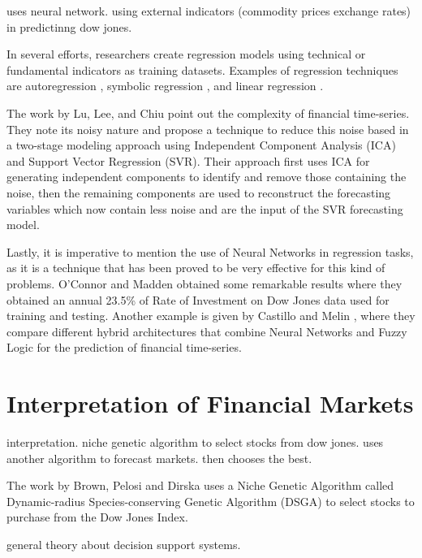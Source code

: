 \cite{Connor2005} uses neural network. using external indicators (commodity
prices exchange rates) in predictinng dow jones.

In several efforts, researchers create regression models using technical or
fundamental indicators as training datasets. Examples of regression techniques
are autoregression \cite{burg1968new}, symbolic regression
\cite{billard2002symbolic}, and linear regression \cite{kutner2004applied}.


The work by Lu, Lee, and Chiu \cite{Lu2009} point out the complexity of
financial time-series. They note its noisy nature and propose a technique to
reduce this noise based in a two-stage modeling approach using Independent
Component Analysis (ICA) and Support Vector Regression (SVR). Their approach
first uses ICA for generating independent components to identify and remove
those containing the noise, then the remaining components are used to
reconstruct the forecasting variables which now contain less noise and are the
input of the SVR forecasting model.


Lastly, it is imperative to mention the use of Neural Networks in regression
tasks, as it is a technique that has been proved to be very effective for this
kind of problems. O'Connor and Madden \cite{Connor2005} obtained some remarkable
results where they obtained an annual 23.5\% of Rate of Investment on Dow Jones
data used for training and testing. Another example is given by Castillo and
Melin \cite{castillo2001simulation}, where they compare different hybrid
architectures that combine Neural Networks and Fuzzy Logic for the prediction of
financial time-series.

\section{Interpretation of Financial Markets}
\label{section:interpretation-of-financial-markets}

\cite{Brown2013} interpretation. niche genetic algorithm to select stocks from dow jones. uses
another algorithm to forecast markets. then chooses the best.

The work by Brown, Pelosi and Dirska uses a Niche Genetic Algorithm called
Dynamic-radius Species-conserving Genetic Algorithm (DSGA) to select stocks to
purchase from the Dow Jones Index.


\cite{Keen1980} general theory about decision support systems.

